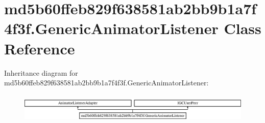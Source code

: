 \hypertarget{classmd5b60ffeb829f638581ab2bb9b1a7f4f3f_1_1GenericAnimatorListener}{}\section{md5b60ffeb829f638581ab2bb9b1a7f4f3f.\+Generic\+Animator\+Listener Class Reference}
\label{classmd5b60ffeb829f638581ab2bb9b1a7f4f3f_1_1GenericAnimatorListener}
Inheritance diagram for md5b60ffeb829f638581ab2bb9b1a7f4f3f.\+Generic\+Animator\+Listener\+:\begin{figure}[H]
\begin{center}
\leavevmode
\includegraphics[height=1.424936cm]{classmd5b60ffeb829f638581ab2bb9b1a7f4f3f_1_1GenericAnimatorListener}
\end{center}
\end{figure}
